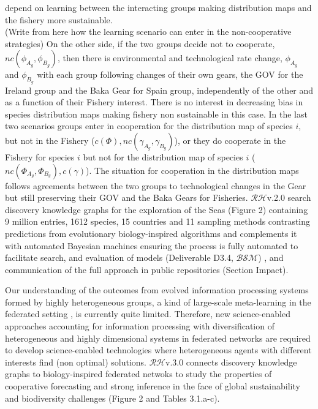 \documentclass[11pt, a4paper]{article} %
\begin{document}
{depend on learning between the interacting groups making distribution
maps and the fishery more sustainable.\\
(Write from here how the learning scenario can enter in the
non-cooperative strategies) On the other side, if the two groups
decide not to cooperate, $nc(\phi_{A_{g}},\phi_{B_{g}})$, then there
is environmental and technological rate change, $\phi_{A_{g}}$ and
$\phi_{B_{g}}$ with each group following changes of their own gears,
the GOV for the Ireland group and the Baka Gear for Spain group,
independently of the other and as a function of their Fishery
interest. There is no interest in decreasing bias in species
distribution maps making fishery non sustainable in this case. In the
last two scenarios groups enter in cooperation for the distribution
map of species $i$, but not in the Fishery
($c(\Phi), nc(\gamma_{A_{g}},\gamma_{B_{g}})$), or they do cooperate
in the Fishery for species $i$ but not for the distribution map of
species $i$ ($nc(\Phi_{A_{g}},\Phi_{B_{g}}), c(\gamma)$). The
situation for cooperation in the distribution maps follows agreements
between the two groups to technological changes in the Gear but still
preserving their GOV and the Baka Gears for
Fisheries. $\mathcal{RH}$v.2.0 search discovery knowledge graphs for
the exploration of the Seas (Figure 2) containing 9 million entries,
1612 species, 15 countries and 11 sampling methods contrasting
predictions from evolutionary biology-inspired algorithms and
complements it with automated Bayesian machines ensuring the process
is fully automated to facilitate search, and evaluation of models
(Deliverable D3.4, $\mathcal{BSM}$) \citep{Guimera2020,Steinruecken},
and communication of the full approach in public repositories (Section
Impact).}
 
Our understanding of the outcomes from evolved information processing
systems formed by highly heterogeneous groups, a kind of large-scale
meta-learning in the federated setting \citep{Dilley2016}, is
currently quite limited. Therefore, new science-enabled approaches
accounting for information processing with diversification of
heterogeneous and highly dimensional systems in federated networks are
required to develop science-enabled technologies where heterogeneous
agents with different interests find (non optimal)
solutions. $\mathcal{RH}$v.3.0 connects discovery knowledge graphs to
biology-inspired federated netwoks to study the properties of
cooperative forecasting and strong inference in the face of global
sustainability and biodiversity challenges (Figure 2 and Tables
3.1.a-c).
\end{document}
